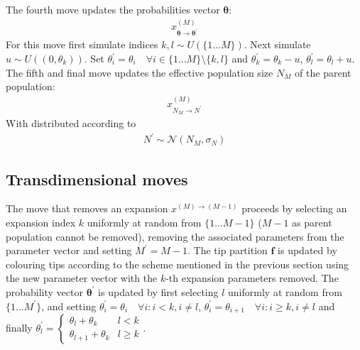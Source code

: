 \documentclass{report}
\theoremstyle{definition}
\begin{document}
The fourth move updates the probabilities vector $\pmb \theta$:
\begin{gather}
  x^{(M)}_{\pmb\theta\to \pmb\theta^{'}}
\end{gather}
For this move first simulate indices $k, l\sim U(\{1...M\})$. Next simulate $u\sim U((0, \theta_k))$. Set $\theta^{'}_i = \theta_i \quad\forall i \in \{1...M\}\setminus\{k,l\}$ and $\theta^{'}_k = \theta_k-u$, $\theta^{'}_l = \theta_l+u$.\\
The fifth and final move updates the effective population size $N_M$ of the parent population:
\begin{gather}
x^{(M)}_{N_M\to N^{'}}
\end{gather}
With distributed according to
\begin{gather}
N^{'}\sim \mathcal{N}(N_M, \sigma_N)
\end{gather}
\subsection{Transdimensional moves}
The move that removes an expansion $x^{(M)\to(M-1)}$ proceeds by selecting an expansion index $k$ uniformly at random from $\{1...M-1\}$ ($M-1$ as parent population cannot be removed), removing the associated parameters from the parameter vector and setting $M^{'} = M-1$. The tip partition $\mathbf{f}$ is updated by colouring tips according to the scheme mentioned in the previous section using the new parameter vector with the $k$-th expansion parameters removed. The probability vector $\pmb\theta^{'}$ is updated by first selecting $l$ uniformly at random from $\{1...M^{'}\}$, and setting $\theta^{'}_i = \theta_i\quad \forall i:i<k,i\neq l$, $\theta^{'}_i = \theta_{i+1}\quad \forall i:i\geq k,i\neq l$ and finally $\theta^{'}_l = 
  \begin{cases} 
      \theta_l+\theta_k & l < k \\
      \theta_{l+1}+\theta_k & l \geq k
  \end{cases}$.\\
\end{document}
